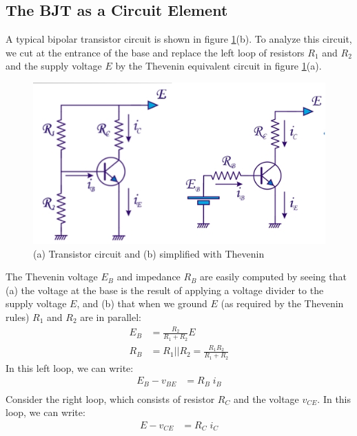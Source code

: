 \subsection{The BJT as a Circuit Element}
A typical bipolar transistor circuit is shown in figure \ref{fig:bjt_load1}(b). To analyze this circuit, we cut at the entrance of the base and replace the left loop of resistors $R_1$ and $R_2$ and the supply voltage $E$ by the Thevenin equivalent circuit in figure  \ref{fig:bjt_load1}(a).

\begin{figure}[h!]
	\centering
	\includegraphics[width=12cm]{figures/ch02/bjt_load1.jpg}
	\caption{(a) Transistor circuit and (b) simplified with Thevenin} 
	\label{fig:bjt_load1}
\end{figure}
The Thevenin voltage $E_B$ and impedance $R_B$ are easily computed by seeing that (a) the voltage at the base is the result of applying a voltage divider to the supply voltage $E$, and (b) that when we ground $E$ (as required by the Thevenin rules) $R_1$ and $R_2$ are in parallel:
\begin{equation}
	\begin{split}
		E_B &= \frac{R_2}{R_1 + R_2} E \\
		R_B &= R_1 || R_2 = \frac{R_1 R_2}{R_1 + R_2}
	\end{split}
\end{equation}
In this left loop, we can write:
\begin{equation}
	\begin{split}
		E_B - v_{BE} &= R_B \; i_B \\
	\end{split}
\end{equation}
Consider the right loop, which consists of resistor $R_C$ and the voltage $v_{CE}$. In this loop, we can write:
\begin{equation}
	\begin{split}
		E - v_{CE} &= R_C \; i_C
	\end{split}
\end{equation}
